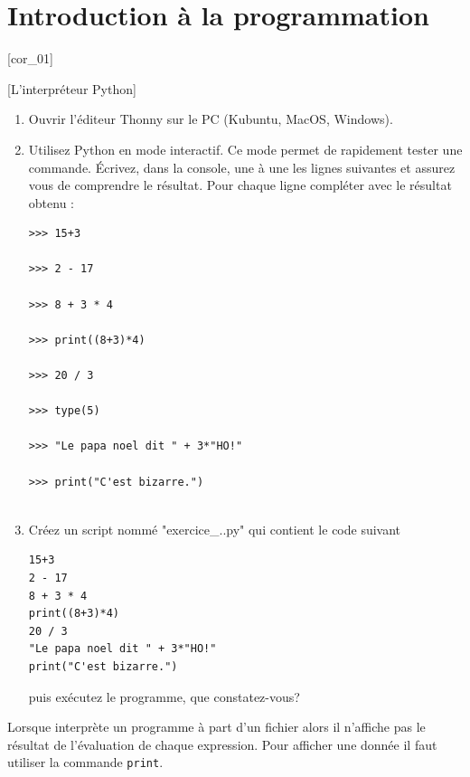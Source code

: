 \documentclass[a4paper,12pt]{article}
\newcommand{\numero}{0}                                    %
\begin{document}

\setcounter{section}{\numero}

\section{Introduction à la programmation}				
[cor_01]



\exo{}[L'interpréteur Python]  ~\\ 
\begin{enumerate}
	\item Ouvrir l'éditeur Thonny sur le PC (Kubuntu, MacOS, Windows).
	\item Utilisez Python en mode interactif. Ce mode permet de rapidement tester une commande. Écrivez, dans la console, une à une les lignes suivantes et assurez vous de comprendre le résultat. Pour chaque ligne compléter avec le résultat obtenu :
	\begin{lstlisting}[numbers=none]
>>> 15+3
		
>>> 2 - 17 
		
>>> 8 + 3 * 4 
		
>>> print((8+3)*4)
		
>>> 20 / 3
		
>>> type(5)
		
>>> "Le papa noel dit " + 3*"HO!"
		
>>> print("C'est bizarre.")
		
	\end{lstlisting}
	\item Créez un script nommé  "exercice\_\thesection.\getexocompteur.py" qui contient le code suivant
	\begin{lstlisting}[numbers=none]
15+3
2 - 17 
8 + 3 * 4 
print((8+3)*4)
20 / 3
"Le papa noel dit " + 3*"HO!"
print("C'est bizarre.")	
	\end{lstlisting}
	puis exécutez le programme, que constatez-vous?
	
\end{enumerate}
\finexo


\begin{eclairage}
	Lorsque \py interprète un programme à part d'un fichier alors il n'affiche pas le résultat de l'évaluation de chaque expression. Pour afficher une donnée il faut utiliser la commande \lstinline{print}.
\end{eclairage}
\end{document}
